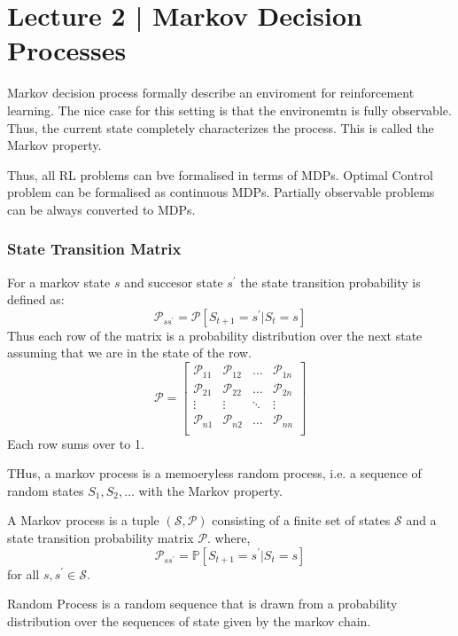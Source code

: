 \section{{Lecture 2 | Markov Decision Processes}}
Markov decision process formally describe an enviroment for reinforcement
learning. The nice case for this setting is that the environemtn is fully observable. Thus,
the current state completely characterizes the process. This is called the Markov property.

Thus, all RL problems can bve formalised in terms of MDPs. Optimal Control problem can be 
formalised as continuous MDPs. Partially observable problems can be always converted 
to MDPs.
\subsubsection*{State Transition Matrix}
For a markov state \(s\) and succesor state \(s^{\prime} \) the state transition probability
is defined as:
\begin{equation}
    \mathcal{P} _{ss^{\prime}} = \mathcal{P} [S_{t+1} = s^{\prime} | S_{t} = s]
\end{equation}
Thus each row of the matrix is a probability distribution over the next state assuming
that we are in the state of the row. 
\[
    \mathcal{P} = 
    \begin{bmatrix}
        \mathcal{P} _{11} & \mathcal{P} _{12} & \dots & \mathcal{P} _{1n} \\
        \mathcal{P} _{21} & \mathcal{P} _{22} & \dots & \mathcal{P} _{2n} \\
        \vdots & \vdots & \ddots & \vdots \\
        \mathcal{P} _{n1} & \mathcal{P} _{n2} & \dots & \mathcal{P} _{nn} \\
    \end{bmatrix}  
\]
Each row sums over to 1.

THus, a markov process is a memoeryless random process, i.e. a sequence of random states
\(S_{1}, S_{2}, \dots \) with the Markov property. 

\begin{definition}
    A Markov process is a tuple \((\mathcal{S}, \mathcal{P} )\) consisting of a finite set
    of states \(\mathcal{S} \) and a state transition probability matrix \(\mathcal{P} \).
    where,
    \[
        \mathcal{P} _{ss^{\prime}} = \mathbb{P}  [S_{t+1} = s^{\prime} | S_{t} = s]  
    \]
    for all \(s, s^{\prime} \in \mathcal{S} \).
\end{definition}
Random Process is a random sequence that is drawn from a probability distribution over 
the sequences of state given by the markov chain.




